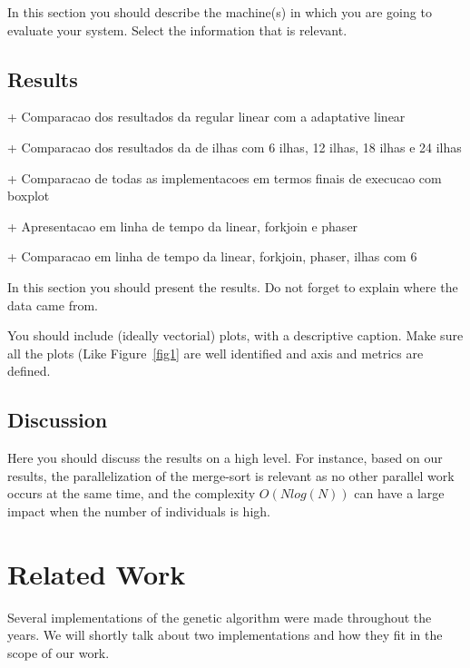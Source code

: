 \documentclass[runningheads]{llncs}
\begin{document}
In this section you should describe the machine(s) in which you are going to evaluate your system. Select the information that is relevant.


\subsection{Results}

+ Comparacao dos resultados da regular linear com a adaptative linear

+ Comparacao dos resultados da de ilhas com 6 ilhas, 12 ilhas, 18 ilhas e 24 ilhas

+ Comparacao de todas as implementacoes em termos finais de execucao com boxplot

+ Apresentacao em linha de tempo da linear, forkjoin e phaser

+ Comparacao em linha de tempo da linear, forkjoin, phaser, ilhas com 6

In this section you should present the results. Do not forget to explain where the data came from. 

You should include (ideally vectorial) plots, with a descriptive caption. Make sure all the plots (Like Figure~\ref{fig1} are well identified and axis and metrics are defined.



\subsection{Discussion}

Here you should discuss the results on a high level. For instance, based on our results, the parallelization of the merge-sort is relevant as no other parallel work occurs at the same time, and the complexity $O(N log(N))$ can have a large impact when the number of individuals is high.

\section{Related Work}

Several implementations of the genetic algorithm were made throughout the years. We will shortly talk about two implementations and how they fit in the scope of our work.
\end{document}
